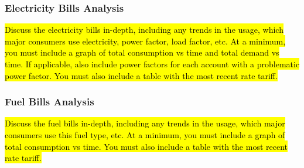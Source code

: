 \subsubsection{Electricity Bills Analysis}

\hl{Discuss the electricity bills in-depth, including any trends in the usage, which major consumers use electricity, power factor, load factor, etc. At a minimum, you must include a graph of total consumption vs time and total demand vs time. If applicable, also include power factors for each account with a problematic power factor. You must also include a table with the most recent rate tariff. }

\subsubsection{Fuel Bills Analysis} 
\hl{Discuss the fuel bills in-depth, including any trends in the usage, which major consumers use this fuel type, etc. At a minimum, you must include a graph of total consumption vs time. You must also include a table with the most recent rate tariff.}
